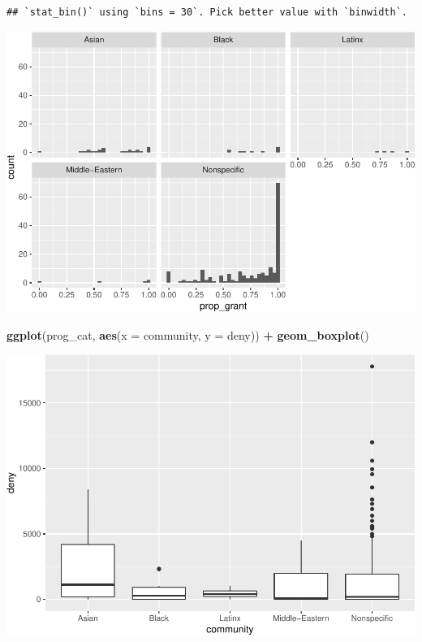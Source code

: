 \documentclass[]{article}
\newenvironment{Shaded}{\begin{snugshade}}{\end{snugshade}}
\newcommand{\DataTypeTok}[1]{\textcolor[rgb]{0.13,0.29,0.53}{#1}}
\newcommand{\KeywordTok}[1]{\textcolor[rgb]{0.13,0.29,0.53}{\textbf{#1}}}
\newcommand{\NormalTok}[1]{#1}
\newcommand{\OperatorTok}[1]{\textcolor[rgb]{0.81,0.36,0.00}{\textbf{#1}}}
\newcommand{\StringTok}[1]{\textcolor[rgb]{0.31,0.60,0.02}{#1}}
\begin{document}
\begin{verbatim}
## `stat_bin()` using `bins = 30`. Pick better value with `binwidth`.
\end{verbatim}

\includegraphics{sofc-funding_files/figure-latex/unnamed-chunk-6-8.pdf}

\begin{Shaded}
\begin{Highlighting}[]
\KeywordTok{ggplot}\NormalTok{(prog_cat, }\KeywordTok{aes}\NormalTok{(}\DataTypeTok{x =}\NormalTok{ community, }\DataTypeTok{y =}\NormalTok{ deny)) }\OperatorTok{+}
\StringTok{  }\KeywordTok{geom_boxplot}\NormalTok{()}
\end{Highlighting}
\end{Shaded}

\includegraphics{sofc-funding_files/figure-latex/unnamed-chunk-7-1.pdf}
\end{document}
